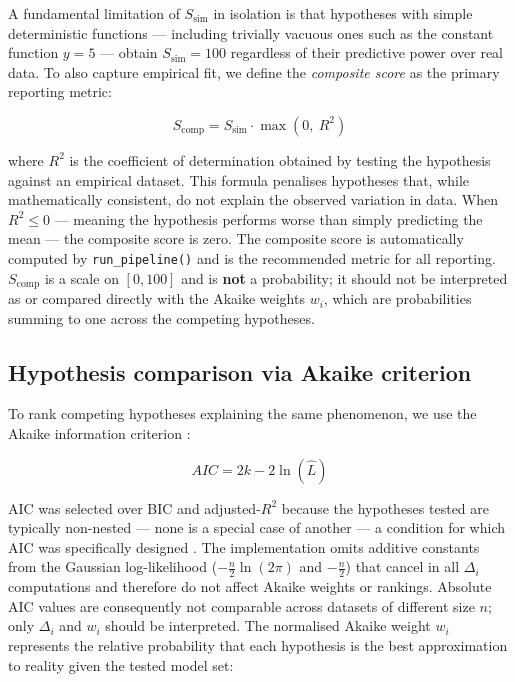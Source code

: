 \documentclass[12pt,a4paper]{article}
\begin{document}
A fundamental limitation of $S_{\text{sim}}$ in isolation is that hypotheses
with simple deterministic functions --- including trivially vacuous ones such as
the constant function $y = 5$ --- obtain $S_{\text{sim}} = 100$ regardless of
their predictive power over real data. To also capture empirical fit, we define
the \textit{composite score} as the primary reporting metric:

\begin{equation}
  S_{\text{comp}} = S_{\text{sim}} \cdot \max(0,\ R^2)
  \label{eq:scomp}
\end{equation}

where $R^2$ is the coefficient of determination obtained by testing the hypothesis
against an empirical dataset. This formula penalises hypotheses that, while
mathematically consistent, do not explain the observed variation in data. When
$R^2 \leq 0$ --- meaning the hypothesis performs worse than simply predicting
the mean --- the composite score is zero. The composite score is automatically
computed by \texttt{run\_pipeline()} and is the recommended metric for all reporting.
$S_{\text{comp}}$ is a scale on $[0, 100]$ and is \textbf{not} a probability;
it should not be interpreted as or compared directly with the Akaike weights
$w_i$, which are probabilities summing to one across the competing hypotheses.

\subsection{Hypothesis comparison via Akaike criterion}

To rank competing hypotheses explaining the same phenomenon, we use the Akaike
information criterion \parencite{burnham2002}:

\begin{equation}
  AIC = 2k - 2\ln(\hat{L})
  \label{eq:aic}
\end{equation}

AIC was selected over BIC and adjusted-$R^2$ because the hypotheses tested are
typically non-nested --- none is a special case of another --- a condition for which
AIC was specifically designed \parencite{burnham2002}. The implementation omits additive
constants from the Gaussian log-likelihood ($-\frac{n}{2}\ln(2\pi)$ and
$-\frac{n}{2}$) that cancel in all $\Delta_i$ computations and therefore do
not affect Akaike weights or rankings. Absolute AIC values are consequently
not comparable across datasets of different size $n$; only $\Delta_i$ and
$w_i$ should be interpreted. The normalised Akaike weight $w_i$
represents the relative probability that each hypothesis is the best
approximation to reality given the tested model set:
\end{document}
